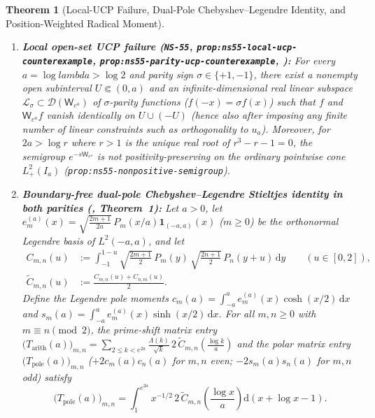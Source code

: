 \documentclass[11pt]{article}
\def\lambda{lambda}%
\newtheorem{theorem}{Theorem}[section]
\theoremstyle{remark}
\newcommand{\dd}{\mathrm d}
\begin{document}
\begin{theorem}[Local-UCP Failure, Dual-Pole Chebyshev--Legendre Identity, and Position-Weighted Radical Moment]
\label{thm:ucp-and-dual-pole}
\leavevmode
\begin{enumerate}[label=(\alph*)]
  \item \textbf{Local open-set UCP failure (\texttt{NS-55}, \texttt{prop:ns55-\allowbreak local-\allowbreak ucp-\allowbreak counterexample}, \texttt{prop:ns55-\allowbreak parity-\allowbreak ucp-\allowbreak counterexample}, ):} For every $a = \log\lambda > \log 2$ and parity sign $\sigma \in \{+1,-1\}$, there exist a nonempty open subinterval $U \Subset (0,a)$ and an infinite-dimensional real linear subspace $\mathcal{L}_\sigma \subset \mathcal{D}(\mathsf{W}_{e^a})$ of $\sigma$-parity functions ($f(-x) = \sigma f(x)$) such that $f$ and $\mathsf{W}_{e^a} f$ vanish identically on $U \cup (-U)$ (hence also after imposing any finite number of linear constraints such as orthogonality to $u_a$). Moreover, for $2a > \log r$ where $r > 1$ is the unique real root of $r^3 - r - 1 = 0$, the semigroup $e^{-s\mathsf{W}_{e^a}}$ is not positivity-preserving on the ordinary pointwise cone $L^2_+(I_a)$ (\texttt{prop:ns55-\allowbreak nonpositive-\allowbreak semigroup}).
  \item \textbf{Boundary-free dual-pole Chebyshev--Legendre Stieltjes identity in both parities (, Theorem~1):} Let $a > 0$, let $e_m^{(a)}(x) = \sqrt{\frac{2m+1}{2a}}\,P_m(x/a)\mathbf{1}_{(-a,a)}(x)$ ($m \ge 0$) be the orthonormal Legendre basis of $L^2(-a,a)$, and let
  \begin{align*}
    C_{m,n}(u) &:= \int_{-1}^{1-u} \sqrt{\frac{2m+1}{2}}\,P_m(y)\,\sqrt{\frac{2n+1}{2}}\,P_n(y+u)\,\dd y \qquad (u \in [0,2]), \\
    \widetilde{C}_{m,n}(u) &:= \frac{C_{m,n}(u) + C_{n,m}(u)}{2}.
  \end{align*}
  Define the Legendre pole moments $c_m(a) = \int_{-a}^a e_m^{(a)}(x)\cosh(x/2)\,\dd x$ and $s_m(a) = \int_{-a}^a e_m^{(a)}(x)\sinh(x/2)\,\dd x$. For all $m, n \ge 0$ with $m \equiv n \pmod 2$, the prime-shift matrix entry $\bigl(T_{\mathrm{arith}}(a)\bigr)_{m,n} = \sum_{2 \le k < e^{2a}} \frac{\Lambda(k)}{\sqrt{k}}\,2\,\widetilde{C}_{m,n}(\frac{\log k}{a})$ and the polar matrix entry $\bigl(T_{\mathrm{pole}}(a)\bigr)_{m,n}$ ($+2c_m(a)c_n(a)$ for $m,n$ even; $-2s_m(a)s_n(a)$ for $m,n$ odd) satisfy
  \begin{equation}\label{eq:dual-pole-stieltjes}
    \bigl(T_{\mathrm{pole}}(a)\bigr)_{m,n} = \int_1^{e^{2a}} x^{-1/2}\,2\,\widetilde{C}_{m,n}\!\left(\frac{\log x}{a}\right)\dd(x + \log x - 1).

\end{equation}
\end{enumerate}
\end{theorem}
\end{document}
